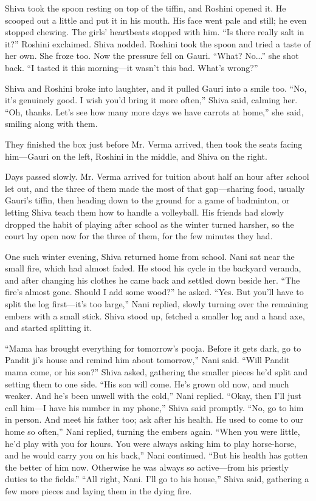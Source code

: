 Shiva took the spoon resting on top of the tiffin, and Roshini opened it. He scooped out a little and put it in his mouth. His face went pale and still; he even stopped chewing. The girls' heartbeats stopped with him. ``Is there really salt in it?'' Roshini exclaimed. Shiva nodded. Roshini took the spoon and tried a taste of her own. She froze too. Now the pressure fell on Gauri. ``What? No...'' she shot back. ``I tasted it this morning—it wasn't this bad. What's wrong?''

Shiva and Roshini broke into laughter, and it pulled Gauri into a smile too. ``No, it's genuinely good. I wish you'd bring it more often,'' Shiva said, calming her. ``Oh, thanks. Let's see how many more days we have carrots at home,'' she said, smiling along with them.

They finished the box just before Mr. Verma arrived, then took the seats facing him—Gauri on the left, Roshini in the middle, and Shiva on the right.

Days passed slowly. Mr. Verma arrived for tuition about half an hour after school let out, and the three of them made the most of that gap—sharing food, usually Gauri's tiffin, then heading down to the ground for a game of badminton, or letting Shiva teach them how to handle a volleyball. His friends had slowly dropped the habit of playing after school as the winter turned harsher, so the court lay open now for the three of them, for the few minutes they had.

One such winter evening, Shiva returned home from school. Nani sat near the small fire, which had almost faded. He stood his cycle in the backyard veranda, and after changing his clothes he came back and settled down beside her. ``The fire's almost gone. Should I add some wood?'' he asked. ``Yes. But you'll have to split the log first—it's too large,'' Nani replied, slowly turning over the remaining embers with a small stick. Shiva stood up, fetched a smaller log and a hand axe, and started splitting it.

``Mama has brought everything for tomorrow's pooja. Before it gets dark, go to Pandit ji's house and remind him about tomorrow,'' Nani said.
``Will Pandit mama come, or his son?'' Shiva asked, gathering the smaller pieces he'd split and setting them to one side.
``His son will come. He's grown old now, and much weaker. And he's been unwell with the cold,'' Nani replied.
``Okay, then I'll just call him—I have his number in my phone,'' Shiva said promptly. ``No, go to him in person. And meet his father too; ask after his health. He used to come to our home so often,'' Nani replied, turning the embers again. ``When you were little, he'd play with you for hours. You were always asking him to play horse-horse, and he would carry you on his back,'' Nani continued. ``But his health has gotten the better of him now. Otherwise he was always so active—from his priestly duties to the fields.''
``All right, Nani. I'll go to his house,'' Shiva said, gathering a few more pieces and laying them in the dying fire.

